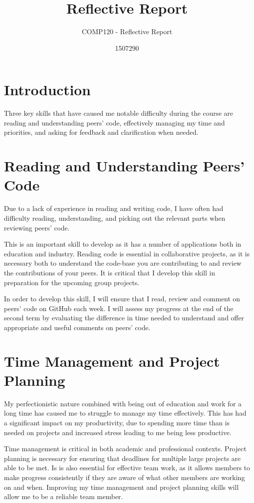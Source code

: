 \documentclass{scrartcl}
\title{Reflective Report}
\subtitle{COMP120 - Reflective Report}
\author{1507290}
\begin{document}
\maketitle

\abstract{}

\section{Introduction}
Three key skills that have caused me notable difficulty during the course are reading and understanding peers' code, effectively managing my time and priorities, and asking for feedback and clarification when needed.

\section{Reading and Understanding Peers' Code}
Due to a lack of experience in reading and writing code, I have often had difficulty reading, understanding, and picking out the relevant parts when reviewing peers' code.

This is an important skill to develop as it has a number of applications both in education and industry. Reading code is essential in collaborative projects, as it is necessary both to understand the code-base you are contributing to and review the contributions of your peers. It is critical that I develop this skill in preparation for the upcoming group projects.

In order to develop this skill, I will ensure that I read, review and comment on peers' code on GitHub each week. I will assess my progress at the end of the second term by evaluating the difference in time needed to understand and offer appropriate and useful comments on peers' code. 

\section{Time Management and Project Planning}
My perfectionistic nature combined with being out of education and work for a long time has caused me to struggle to manage my time effectively. This has had a significant impact on my productivity, due to spending more time than is needed on projects and increased stress leading to me being less productive.

Time management is critical in both academic and professional contexts. Project planning is necessary for ensuring that deadlines for multiple large projects are able to be met. Is is also essential for effective team work, as it allows members to make progress consistently if they are aware of what other members are working on and when. Improving my time management and project planning skills will allow me to be a reliable team member.
\end{document}
